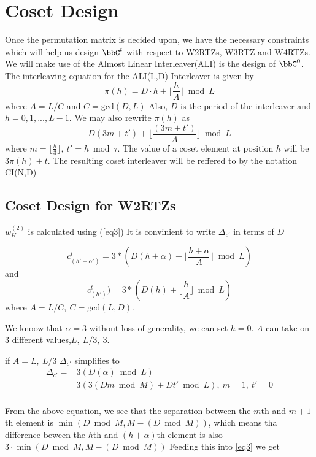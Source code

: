 \section{Coset Design}
Once the permutation matrix is decided upon, we have the necessary constraints which will help us design $\bbC^t$ with respect to W2RTZs, W3RTZ and W4RTZs.
We will make use of the Almost Linear Interleaver(ALI) is the design of $\bbC^0$. 
The interleaving equation for the ALI(L,D) Interleaver is given by 
$$
\pi(h)=D \cdot h + \Big\lfloor \frac{h}{A} \Big\rfloor \bmod L
$$ 
where $A=L/C$ and $C=\text{gcd}(D,L)$ Also, $D$ is the period of the interleaver and $h=0,1,...,L-1$.
We may also rewrite $\pi(h)$ as 
\begin{equation}
D(3m+t')+\lfloor\frac{(3m+t')}{A}\rfloor \bmod L
\end{equation}
where $m=\lfloor \frac{h}{3} \rfloor,~t'=h \bmod \tau$. 
The value of a coset element at position $h$ will be $3\pi(h)+t$. The resulting coset interleaver will be reffered to by the notation CI(N,D)


\subsection{Coset Design for W2RTZs}
$w_H^{(2)}$ is calculated using (\ref{eq3})
 It is convinient to write $\Delta_{c'}$ in terms of $D$ 

$$c_{(h'+\alpha')}^{t}=3*(D(h+\alpha)+ \lfloor \frac{h+\alpha}{A} \rfloor \bmod L)$$ and $$c_{(h')}^{t})=3*(D(h)+ \lfloor \frac{h}{A} \rfloor \bmod L)$$
where $A=L/C,~C=\text{gcd}(L,D)$. 

We knoow that $\alpha=3$ without loss of generality, we can set $h=0$. 
$A$ can take on $3$ different values,$L,~L/3,~3$.

if $A=L,~L/3$ $\Delta_{c'}$ simplifies to 
\begin{equation}
\begin{split}
\Delta_{c'}=&3(D(\alpha) \bmod L)\\
=&3(3(Dm \bmod M) + Dt'  \bmod L),~m=1,~t'=0\\
\end{split}
\end{equation}

From the above equation, we see that the separation between the $m$th and $m+1$th element is $\min(D \bmod M, M-(D \bmod M))$, which means tha difference beween the $h$th and $(h+\alpha)$th element is also $3\cdot \min(D \bmod M, M-(D \bmod M))$
Feeding this into \ref{eq3} we get

